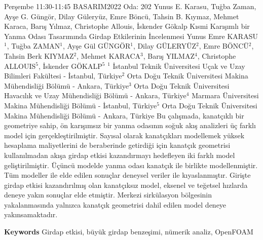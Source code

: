 
    \begin{abstract_basarim}
    {Perşembe 11:30-11:45}
    {BASARIM2022}
    {Oda: 202}
    {Yunus E. Karasu, Tuğba Zaman, Ayşe G. Güngör, Dilay Güleryüz, Emre Böncü, Tahsin B. Kıymaz, Mehmet Karaca, Barış Yılmaz, Christophe Allouis, İskender Gökalp}
    {Kısmi Karışımlı bir Yanma Odası Tasarımında Girdap Etkilerinin İncelenmesi}
    {%
    Yunus Emre KARASU$^{1}$, Tuğba ZAMAN$^{1}$, Ayşe Gül GÜNGÖR$^{1}$, Dilay GÜLERYÜZ$^{2}$, Emre BÖNCÜ$^{2}$, Tahsin Berk KIYMAZ$^{2}$, Mehmet KARACA$^{3}$, Barış YILMAZ$^{4}$, Christophe ALLOUIS$^{5}$, İskender GÖKALP$^{5}$}
    {%
    }
    {%
    $^1$ İstanbul Teknik Üniversitesi Uçak ve Uzay Bilimleri Fakültesi - İstanbul, Türkiye\newline{}$^2$ Orta Doğu Teknik Üniversitesi Makina Mühendisliği Bölümü - Ankara, Türkiye\newline{}$^3$ Orta Doğu Teknik Üniversitesi Havacılık ve Uzay Mühendisliği Bölümü - Ankara, Türkiye\newline{}$^4$ Marmara Üniversitesi Makina Mühendisliği Bölümü - İstanbul, Türkiye\newline{}$^5$ Orta Doğu Teknik Üniversitesi Makina Mühendisliği Bölümü - Ankara, Türkiye}
    Bu çalışmada, kanatçıklı bir geometriye sahip, ön karışımsız bir yanma odasının soğuk akış analizleri üç farklı model için gerçekleştirilmiştir. Sayısal olarak kanatçıkları modellemek yüksek hesaplama maliyetlerini de beraberinde getirdiği için kanatçık geometrisi kullanılmadan akışa girdap etkisi kazandırmayı hedefleyen iki farklı model geliştirilmiştir. Üçüncü modelde yanma odası kanatçık ile birlikte modellenmiştir. Tüm modeller ile elde edilen sonuçlar deneysel veriler ile kıyaslanmıştır. \newline Girişte girdap etkisi kazandırılmış olan kanatçıksız model, eksenel ve teğetsel hızlarda deneye yakın sonuçlar elde etmiştir. Merkezi sirkülasyon bölgesinin yakalanmasında yalnızca kanatçık geometrisi dahil edilen model deneye yakınsamaktadır. 
    
        \textbf{Keywords} \newline{}Girdap etkisi, büyük girdap benzeşimi, nümerik analiz, OpenFOAM
    \end{abstract_basarim}
    